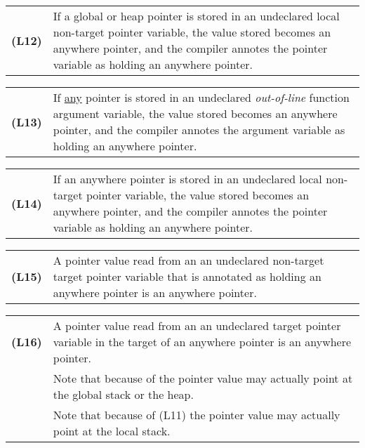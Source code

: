 \documentclass[12pt]{article}
\newcommand{\key}[1]{{\rm \bfseries #1}}
\newenvironment{indpar}[1][0.3in]%
	{\begin{list}{}%
		     {\setlength{\itemsep}{0in}%
		      \setlength{\topsep}{0in}%
		      \setlength{\parsep}{1ex}%
		      \setlength{\labelwidth}{#1}%
		      \setlength{\leftmargin}{#1}%
		      \addtolength{\leftmargin}{\labelsep}}%
	 \item}%
	{\end{list}}
\begin{document}
\newcommand{\GlobalOrHeapToUndeclared}{(L12)}
\newcommand{\AnyToOutOfLineUndeclared}{(L13)}
\begin{indpar}[0.2in]

\begin{tabular}{p{0.5in}p{5.0in}}
\key{\GlobalOrHeapToUndeclared}
		& If a global or heap pointer is stored in an
                  undeclared local non-target pointer variable,
		  the value stored becomes an anywhere pointer,
		  and the compiler
		  annotes the pointer variable as holding
		  an anywhere pointer.
\end{tabular}

\begin{tabular}{p{0.5in}p{5.0in}}
\key{\AnyToOutOfLineUndeclared}
		& If \underline{any} pointer is stored in an
                  undeclared {\em out-of-line} function argument variable,
		  the value stored becomes an anywhere pointer,
		  and the compiler
		  annotes the argument variable as holding
		  an anywhere pointer.
\end{tabular}

\begin{tabular}{p{0.5in}p{5.0in}}
\key{(L14)}	& If an anywhere pointer is stored in an
                  undeclared local non-target pointer variable,
		  the value stored becomes an anywhere pointer,
		  and the compiler
		  annotes the pointer variable as holding
		  an anywhere pointer.
\end{tabular}

\begin{tabular}{p{0.5in}p{5.0in}}
\key{(L15)}	& A pointer value read from an
		  an undeclared non-target target pointer variable
		  that is annotated as holding an anywhere pointer
		  is an anywhere pointer.
\end{tabular}

\begin{tabular}{p{0.5in}p{5.0in}}
\key{(L16)}	& A pointer value read from an
		  an undeclared target pointer variable
		  in the target of an anywhere pointer
		  is an anywhere pointer.
\\[1ex]
		& Note that because of \UndeclaredToGlobalOrHeap{}
		  the pointer value may actually
		  point at the global stack or the heap.
\\[1ex]
		& Note that because of (L11) the pointer value may actually
		  point at the local stack.
\end{tabular}

\end{indpar}
\end{document}

